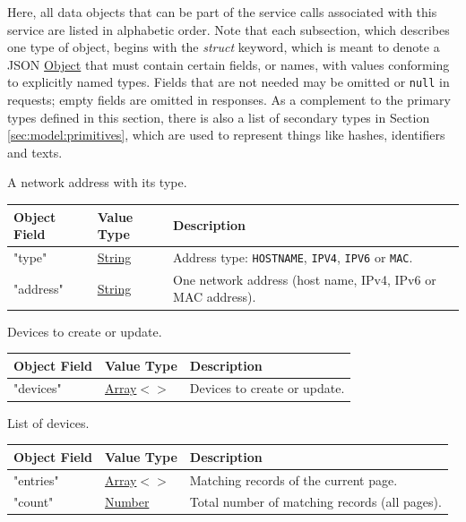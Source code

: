 \documentclass[a4paper]{arrowhead}
\newcommand{\mref}[2][]{{\textcolor{ArrowheadPurple}{\hyperref[sec:model:#2]{\ifstrempty{#1}{#2}{#1}}}}}
\newcommand{\pref}[1]{{\textcolor{ArrowheadGrey}{\hyperref[sec:model:primitives:#1]{#1}}}}
\begin{document}
Here, all data objects that can be part of the service calls associated with this service are listed in alphabetic order.
Note that each subsection, which describes one type of object, begins with the \textit{struct} keyword, which is meant to denote a JSON \pref{Object} that must contain certain fields, or names, with values conforming to explicitly named types.
Fields that are not needed may be omitted or \texttt{null} in requests; empty fields are omitted in responses.
As a complement to the primary types defined in this section, there is also a list of secondary types in Section \ref{sec:model:primitives}, which are used to represent things like hashes, identifiers and texts.


A network address with its type.


\noindent\begin{tabularx}{\textwidth}{| >{\raggedright\arraybackslash}p{3.9cm} | >{\raggedright\arraybackslash\small}p{5.3cm} | X |} \hline
\rowcolor{gray!33} Object Field & Value Type & Description \\ \hline
"type" & \pref{String} & Address type: \texttt{HOSTNAME}, \texttt{IPV4}, \texttt{IPV6} or \texttt{MAC}. \\ \hline
"address" & \pref{String} & One network address (host name, IPv4, IPv6 or MAC address). \\ \hline
\end{tabularx}




Devices to create or update.


\noindent\begin{tabularx}{\textwidth}{| >{\raggedright\arraybackslash}p{3.9cm} | >{\raggedright\arraybackslash\small}p{5.3cm} | X |} \hline
\rowcolor{gray!33} Object Field & Value Type & Description \\ \hline
"devices" & \pref{Array}$<$\allowbreak{}\mref{DeviceRequest}$>$ & Devices to create or update. \\ \hline
\end{tabularx}




List of devices.


\noindent\begin{tabularx}{\textwidth}{| >{\raggedright\arraybackslash}p{3.9cm} | >{\raggedright\arraybackslash\small}p{5.3cm} | X |} \hline
\rowcolor{gray!33} Object Field & Value Type & Description \\ \hline
"entries" & \pref{Array}$<$\allowbreak{}\mref{DeviceResponse}$>$ & Matching records of the current page. \\ \hline
"count" & \pref{Number} & Total number of matching records (all pages). \\ \hline
\end{tabularx}
\end{document}
